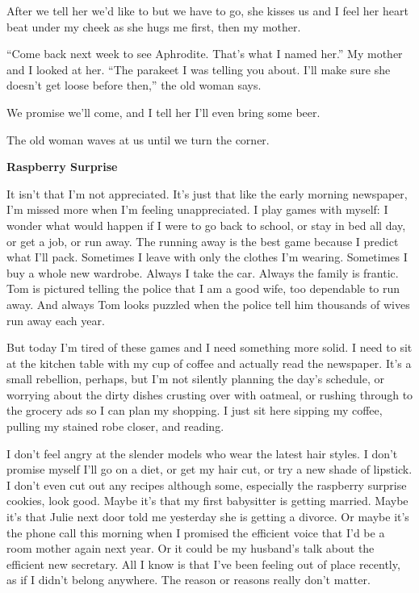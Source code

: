 \documentclass[
]{article}
\begin{document}
After we tell her we'd like to but we have to go, she kisses us and I
feel her heart beat under my cheek as she hugs me first, then my mother.

``Come back next week to see Aphrodite. That's what I named her.'' My
mother and I looked at her. ``The parakeet I was telling you about. I'll
make sure she doesn't get loose before then,'' the old woman says.

We promise we'll come, and I tell her I'll even bring some beer.

The old woman waves at us until we turn the corner.

\textbf{\hfill\break
}

\textbf{Raspberry Surprise}

It isn't that I'm not appreciated. It's just that like the early morning
newspaper, I'm missed more when I'm feeling unappreciated. I play games
with myself: I wonder what would happen if I were to go back to school,
or stay in bed all day, or get a job, or run away. The running away is
the best game because I predict what I'll pack. Sometimes I leave with
only the clothes I'm wearing. Some­times I buy a whole new wardrobe.
Always I take the car. Always the family is frantic. Tom is pictured
telling the police that I am a good wife, too dependable to run away.
And always Tom looks puzzled when the police tell him thousands of wives
run away each year.

But today I'm tired of these games and I need something more solid. I
need to sit at the kitchen table with my cup of coffee and actually read
the newspaper. It's a small rebellion, perhaps, but I'm not silently
planning the day's schedule, or worrying about the dirty dishes crusting
over with oatmeal, or rushing through to the grocery ads so I can plan
my shopping. I just sit here sipping my coffee, pulling my stained robe
closer, and reading.

I don't feel angry at the slender models who wear the latest hair
styles. I don't promise myself I'll go on a diet, or get my hair cut, or
try a new shade of lipstick. I don't even cut out any recipes although
some, especially the raspberry surprise cookies, look good. Maybe it's
that my first babysitter is getting married. Maybe it's that Julie next
door told me yesterday she is getting a divorce. Or maybe it's the phone
call this morning when I promised the efficient voice that I'd be a room
mother again next year. Or it could be my husband's talk about the
efficient new secretary. All I know is that I've been feeling out of
place recently, as if I didn't belong anywhere. The reason or reasons
really don't matter.
\end{document}
